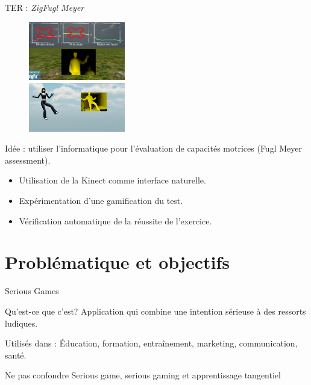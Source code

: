 \documentclass{beamer}
\begin{document}
		
		\begin{frame}{TER : \emph{ZigFugl Meyer}}
			\begin{minipage}{0.40\linewidth}
				\begin{figure}
					\includegraphics[width=4.2cm]{../images/zigfugl-meyer_1.png}\\
					\includegraphics[width=4.2cm]{../images/zigfugl-meyer_2.png}
				\end{figure}
			\end{minipage}
			\begin{minipage}{6cm}%
				Idée : utiliser l'informatique pour l'évaluation de capacités motrices (Fugl Meyer assessment). 
					\begin{itemize}
						\item Utilisation de la Kinect comme interface naturelle.
						\item Expérimentation d'une gamification du test.
						\item Vérification automatique de la réussite de l'exercice.
					\end{itemize}
			\end{minipage}
		\end{frame}
	
	\section{Problématique et objectifs}
		\begin{frame}{Serious Games}
			\begin{block}{Qu'est-ce que c'est?}
				Application qui combine une intention sérieuse à des ressorts ludiques.
			\end{block}\pause
			\begin{exampleblock}{Utilisés dans :}
				Éducation, formation, entraînement, marketing, communication, santé.
			\end{exampleblock}	\pause
			\begin{alertblock}{Ne pas confondre}
				Serious game, serious gaming et apprentissage tangentiel
			\end{alertblock}
		\end{frame}
	
\end{document}
